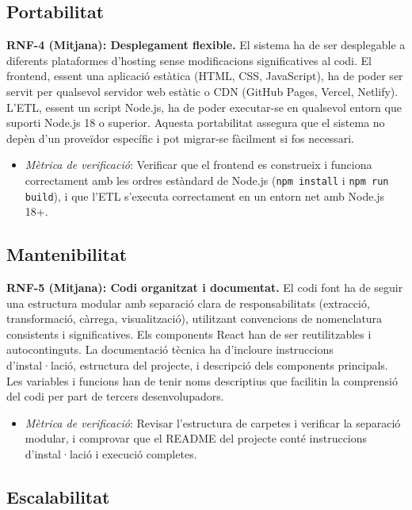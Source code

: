 \subsection{Portabilitat}

\textbf{RNF-4 (Mitjana): Desplegament flexible.} El sistema ha de ser desplegable a diferents plataformes d'hosting sense modificacions significatives al codi. El frontend, essent una aplicació estàtica (HTML, CSS, JavaScript), ha de poder ser servit per qualsevol servidor web estàtic o CDN (GitHub Pages, Vercel, Netlify). L'ETL, essent un script Node.js, ha de poder executar-se en qualsevol entorn que suporti Node.js 18 o superior. Aquesta portabilitat assegura que el sistema no depèn d'un proveïdor específic i pot migrar-se fàcilment si fos necessari.

\begin{itemize}
    \item \textit{Mètrica de verificació}: Verificar que el frontend es construeix i funciona correctament amb les ordres estàndard de Node.js (\texttt{npm install} i \texttt{npm run build}), i que l'ETL s'executa correctament en un entorn net amb Node.js 18+.
\end{itemize}

\subsection{Mantenibilitat}

\textbf{RNF-5 (Mitjana): Codi organitzat i documentat.} El codi font ha de seguir una estructura modular amb separació clara de responsabilitats (extracció, transformació, càrrega, visualització), utilitzant convencions de nomenclatura consistents i significatives. Els components React han de ser reutilitzables i autocontinguts. La documentació tècnica ha d'incloure instruccions d'instal·lació, estructura del projecte, i descripció dels components principals. Les variables i funcions han de tenir noms descriptius que facilitin la comprensió del codi per part de tercers desenvolupadors.

\begin{itemize}
    \item \textit{Mètrica de verificació}: Revisar l'estructura de carpetes i verificar la separació modular, i comprovar que el README del projecte conté instruccions d'instal·lació i execució completes.
\end{itemize}

\subsection{Escalabilitat}

